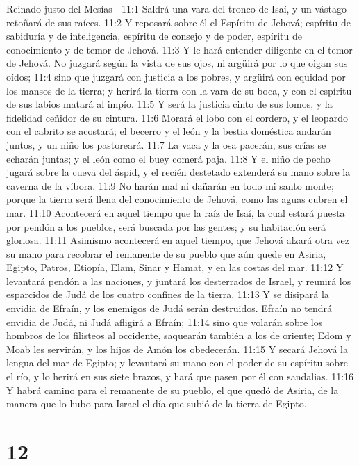 Reinado justo del Mesías  

11:1 Saldrá una vara del tronco de Isaí, y un vástago retoñará de sus raíces. 
11:2 Y reposará sobre él el Espíritu de Jehová; espíritu de sabiduría y de inteligencia, espíritu de consejo y de poder, espíritu de conocimiento y de temor de Jehová.  
11:3 Y le hará entender diligente en el temor de Jehová. No juzgará según la vista de sus ojos, ni argüirá por lo que oigan sus oídos;  
11:4 sino que juzgará con justicia a los pobres, y argüirá con equidad por los mansos de la tierra; y herirá la tierra con la vara de su boca, y con el espíritu de sus labios matará al impío. 
11:5 Y será la justicia cinto de sus lomos, y la fidelidad ceñidor de su cintura.  
11:6 Morará el lobo con el cordero, y el leopardo con el cabrito se acostará; el becerro y el león y la bestia doméstica andarán juntos, y un niño los pastoreará.  
11:7 La vaca y la osa pacerán, sus crías se echarán juntas; y el león como el buey comerá paja.  
11:8 Y el niño de pecho jugará sobre la cueva del áspid, y el recién destetado extenderá su mano sobre la caverna de la víbora.  
11:9 No harán mal ni dañarán en todo mi santo monte; porque la tierra será llena del conocimiento de Jehová, como las aguas cubren el mar. 
11:10 Acontecerá en aquel tiempo que la raíz de Isaí, la cual estará puesta por pendón a los pueblos, será buscada por las gentes; y su habitación será gloriosa.  
11:11 Asimismo acontecerá en aquel tiempo, que Jehová alzará otra vez su mano para recobrar el remanente de su pueblo que aún quede en Asiria, Egipto, Patros, Etiopía, Elam, Sinar y Hamat, y en las costas del mar.  
11:12 Y levantará pendón a las naciones, y juntará los desterrados de Israel, y reunirá los esparcidos de Judá de los cuatro confines de la tierra.  
11:13 Y se disipará la envidia de Efraín, y los enemigos de Judá serán destruidos. Efraín no tendrá envidia de Judá, ni Judá afligirá a Efraín;  
11:14 sino que volarán sobre los hombros de los filisteos al occidente, saquearán también a los de oriente; Edom y Moab les servirán, y los hijos de Amón los obedecerán.  
11:15 Y secará Jehová la lengua del mar de Egipto; y levantará su mano con el poder de su espíritu sobre el río, y lo herirá en sus siete brazos, y hará que pasen por él con sandalias. 
11:16 Y habrá camino para el remanente de su pueblo, el que quedó de Asiria, de la manera que lo hubo para Israel el día que subió de la tierra de Egipto.  

\chapter{12}

